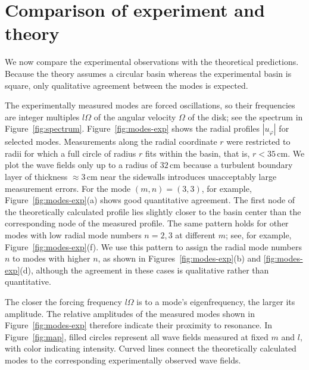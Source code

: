 \documentclass[aps,twocolumn]{revtex4-2}
\begin{document}
\section{Comparison of experiment and theory}
\label{sec:results}

We now compare the experimental observations with the theoretical predictions. Because the theory assumes a circular basin whereas the experimental basin is square, only qualitative agreement between the modes is expected.

The experimentally measured modes are forced oscillations, so their frequencies are integer multiples $l\Omega$ of the angular velocity $\Omega$ of the disk; see the spectrum in Figure~\ref{fig:spectrum}. Figure~\ref{fig:modes-exp} shows the radial profiles $|u_\varphi|$ for selected modes. Measurements along the radial coordinate $r$ were restricted to radii for which a full circle of radius $r$ fits within the basin, that is, $r<35\,\text{cm}$. We plot the wave fields only up to a radius of $32\,\text{cm}$ because a turbulent boundary layer of thickness $\approx 3\,\text{cm}$ near the sidewalls introduces unacceptably large measurement errors. For the mode $(m,n) = (3,3)$, for example, Figure~\ref{fig:modes-exp}(a) shows good quantitative agreement. The first node of the theoretically calculated profile lies slightly closer to the basin center than the corresponding node of the measured profile. The same pattern holds for other modes with low radial mode numbers $n=2,3$ at different $m$; see, for example, Figure~\ref{fig:modes-exp}(f). We use this pattern to assign the radial mode numbers $n$ to modes with higher $n$, as shown in Figures~\ref{fig:modes-exp}(b) and \ref{fig:modes-exp}(d), although the agreement in these cases is qualitative rather than quantitative.

The closer the forcing frequency $l\Omega$ is to a mode's eigenfrequency, the larger its amplitude. The relative amplitudes of the measured modes shown in Figure~\ref{fig:modes-exp} therefore indicate their proximity to resonance. In Figure~\ref{fig:map}, filled circles represent all wave fields measured at fixed $m$ and $l$, with color indicating intensity. Curved lines connect the theoretically calculated modes to the corresponding experimentally observed wave fields.
\end{document}
